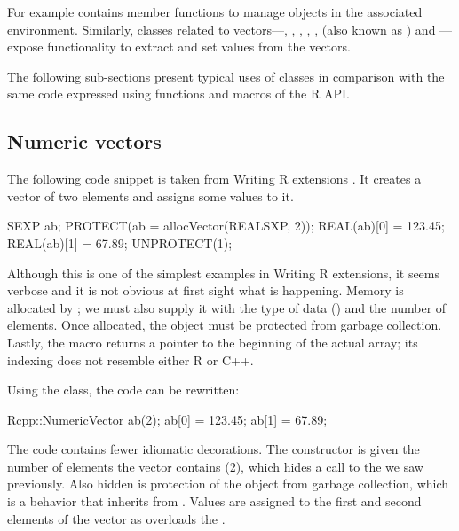 For example  contains 
member functions to manage objects in the associated environment. 
Similarly, classes related to vectors---, , 
, , , 
 (also known as ) and 
---expose functionality to extract and set values from the vectors.

The following sub-sections present typical uses of  classes in
comparison with the same code expressed using functions and macros of the R API.

\subsection{Numeric vectors}

The following code snippet is taken from Writing R extensions
\citep{R:exts}. It creates a  vector of two elements 
and assigns some values to it. 

\begin{example}
SEXP ab;
PROTECT(ab = allocVector(REALSXP, 2));
REAL(ab)[0] = 123.45;
REAL(ab)[1] = 67.89;
UNPROTECT(1);
\end{example}

Although this is one of the simplest examples in Writing R extensions, 
it seems verbose and it is not obvious at first sight what is happening.
Memory is allocated by ; we must also supply it with
the type of data () and the number of elements.  Once
allocated, the  object must be protected from garbage
collection.
Lastly, the  macro returns a pointer to the
beginning of the actual array; its indexing does not resemble either R or
C++.

Using the  class, the code can be rewritten: 

\begin{example}
Rcpp::NumericVector ab(2);
ab[0] = 123.45;
ab[1] = 67.89;
\end{example}

The code contains fewer idiomatic decorations. The 
constructor is given the number of elements the vector contains (2), which
hides a call to the  we saw previously. Also hidden is
protection of the object from garbage collection, which is a behavior that
 inherits from .  Values are assigned to
the first and second elements of the vector as  overloads
the .

